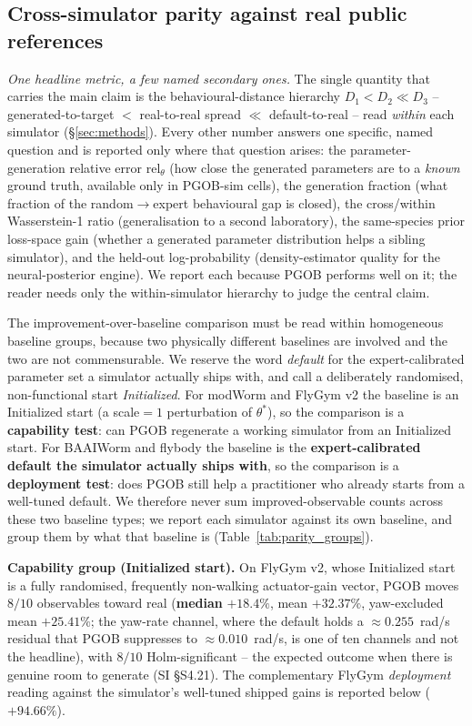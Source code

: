 \documentclass[11pt]{article}
\begin{document}
\subsection{Cross-simulator parity against real public references}
\label{sec:parity}

\emph{One headline metric, a few named secondary ones.} The single quantity that carries the main claim is the behavioural-distance hierarchy $D_1{<}D_2{\ll}D_3$ -- generated-to-target $<$ real-to-real spread $\ll$ default-to-real -- read \emph{within} each simulator (\S\ref{sec:methods}). Every other number answers one specific, named question and is reported only where that question arises: the parameter-generation relative error $\mathrm{rel}_\theta$ (how close the generated parameters are to a \emph{known} ground truth, available only in PGOB-sim cells), the generation fraction (what fraction of the random$\to$expert behavioural gap is closed), the cross/within Wasserstein-1 ratio (generalisation to a second laboratory), the same-species prior loss-space gain (whether a generated parameter distribution helps a sibling simulator), and the held-out log-probability (density-estimator quality for the neural-posterior engine). We report each because PGOB performs well on it; the reader needs only the within-simulator hierarchy to judge the central claim.

The improvement-over-baseline comparison must be read within homogeneous baseline groups, because two physically different baselines are involved and the two are not commensurable. We reserve the word \emph{default} for the expert-calibrated parameter set a simulator actually ships with, and call a deliberately randomised, non-functional start \emph{Initialized}. For modWorm and FlyGym v2 the baseline is an Initialized start (a scale${=}1$ perturbation of $\theta^{*}$), so the comparison is a \textbf{capability test}: can PGOB regenerate a working simulator from an Initialized start. For BAAIWorm and flybody the baseline is the \textbf{expert-calibrated default the simulator actually ships with}, so the comparison is a \textbf{deployment test}: does PGOB still help a practitioner who already starts from a well-tuned default. We therefore never sum improved-observable counts across these two baseline types; we report each simulator against its own baseline, and group them by what that baseline is (Table~\ref{tab:parity_groups}).

\textbf{Capability group (Initialized start).} On FlyGym v2, whose Initialized start is a fully randomised, frequently non-walking actuator-gain vector, PGOB moves $8/10$ observables toward real (\textbf{median} $+18.4\%$, mean $+32.37\%$, yaw-excluded mean $+25.41\%$; the yaw-rate channel, where the default holds a $\approx 0.255$~rad/s residual that PGOB suppresses to $\approx 0.010$~rad/s, is one of ten channels and not the headline), with $8/10$ Holm-significant -- the expected outcome when there is genuine room to generate (SI \S S4.21). The complementary FlyGym \emph{deployment} reading against the simulator's well-tuned shipped gains is reported below ($+94.66\%$).
\end{document}
